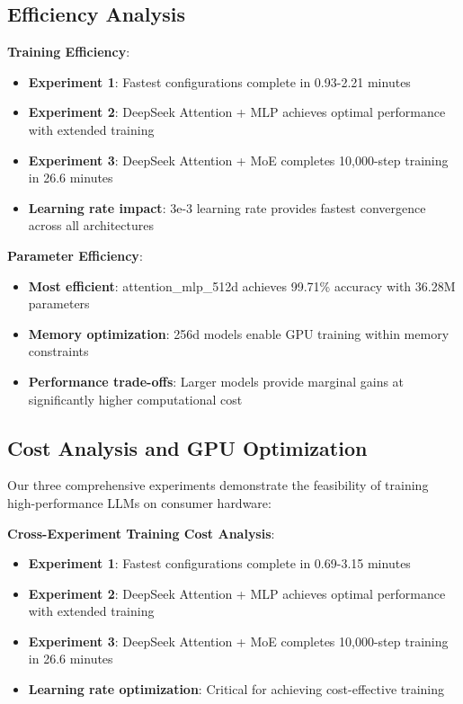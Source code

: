 \documentclass[11pt,a4paper]{article}
\begin{document}
\subsection{Efficiency Analysis}

\textbf{Training Efficiency}:
\begin{itemize}
    \item \textbf{Experiment 1}: Fastest configurations complete in 0.93-2.21 minutes
    \item \textbf{Experiment 2}: DeepSeek Attention + MLP achieves optimal performance with extended training
    \item \textbf{Experiment 3}: DeepSeek Attention + MoE completes 10,000-step training in 26.6 minutes
    \item \textbf{Learning rate impact}: 3e-3 learning rate provides fastest convergence across all architectures
\end{itemize}

\textbf{Parameter Efficiency}:
\begin{itemize}
    \item \textbf{Most efficient}: attention\_mlp\_512d achieves 99.71\% accuracy with 36.28M parameters
    \item \textbf{Memory optimization}: 256d models enable GPU training within memory constraints
    \item \textbf{Performance trade-offs}: Larger models provide marginal gains at significantly higher computational cost
\end{itemize}

\subsection{Cost Analysis and GPU Optimization}

Our three comprehensive experiments demonstrate the feasibility of training high-performance LLMs on consumer hardware:

\textbf{Cross-Experiment Training Cost Analysis}:
\begin{itemize}
    \item \textbf{Experiment 1}: Fastest configurations complete in 0.69-3.15 minutes
    \item \textbf{Experiment 2}: DeepSeek Attention + MLP achieves optimal performance with extended training
    \item \textbf{Experiment 3}: DeepSeek Attention + MoE completes 10,000-step training in 26.6 minutes
    \item \textbf{Learning rate optimization}: Critical for achieving cost-effective training
\end{itemize}
\end{document}

